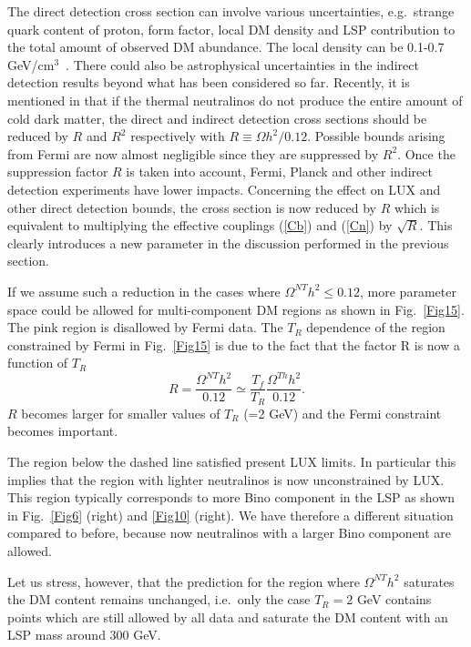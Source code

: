 \documentclass[11pt,a4paper]{article}
\begin{document}
The direct detection cross section can involve various uncertainties, e.g.~strange quark content of proton, form factor, local DM density and LSP contribution to the total amount of observed DM abundance.  The local density can be 0.1-0.7 GeV/cm$^3$~\cite{Read}. There could also be astrophysical uncertainties in the indirect detection results beyond what has been considered so far. Recently, it is  mentioned in \cite{baer} that if the thermal neutralinos do not produce the entire amount of cold dark matter, the  
 direct and indirect detection cross sections should be reduced by $R$ and $R^2$ respectively with $R\equiv \Omega h^2/0.12$. Possible bounds arising from Fermi are now almost negligible since they are suppressed by $R^2$. Once the suppression factor $R$ is taken into account, Fermi, Planck and other indirect detection experiments have lower impacts. Concerning the effect on LUX and other direct detection bounds, the cross section is now reduced by $R$ which is equivalent to multiplying the effective couplings (\ref{Cb}) and (\ref{Cn}) by $\sqrt{R}$. This clearly introduces a new parameter in 
the discussion performed in the previous section.

If we assume such a reduction in the cases where $\Omega^{NT} h^2\le 0.12$, more parameter space could be allowed for multi-component DM regions as shown in Fig.~\ref{Fig15}. The pink region is disallowed by Fermi data. The $T_R$ dependence of the region constrained by Fermi in  Fig.~\ref{Fig15} is due to the fact that the  factor R is now a function of $T_R$
\begin{equation}
R = \frac{\Omega^{NT} h^2}{0.12} \simeq \frac{T_f}{T_R} \frac{\Omega^{Th} h^2}{0.12}  .
\end{equation}
$R$ becomes larger for smaller values of $T_R$ (=2 GeV) and the Fermi constraint becomes important.

The region below the dashed line satisfied present LUX limits. In particular this implies that the region with lighter neutralinos is now unconstrained by LUX. This region typically corresponds to more Bino component in the LSP as shown in Fig.~\ref{Fig6} (right) and \ref{Fig10} (right). We have therefore a different situation compared to before, because now neutralinos with a larger Bino component are allowed. 

Let us stress, however, that the prediction for the region where $\Omega^{NT} h^2$ saturates the DM content remains unchanged, i.e.~only the case $T_R=2$ GeV contains points which are still allowed by all data and saturate the DM content with an LSP mass around $300$ GeV.
\end{document}
